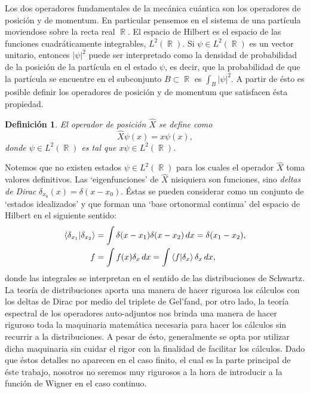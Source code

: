 \documentclass[a4paper]{report}
\DeclareMathOperator{\R}{\mathbb{R}}
\newtheorem{definition}{Definición}
\begin{document}
  Los dos operadores fundamentales de la mecánica cuántica
  son los operadores de posición y de momentum. En
  particular pensemos en el sistema de una partícula
  moviendose sobre la recta real $\R$. El espacio de Hilbert
  es el espacio de las funciones cuadráticamente
  integrables, $L^2(\R)$. Si $\psi \in L^2(\R)$ es un vector
  unitario, entonces $|\psi|^2$ puede ser interpretado como
  la densidad de probabilidad de la posición de la partícula
  en el estado $\psi$, es decir, que la probabilidad de que
  la partícula se encuentre en el subconjunto $B \subset \R$
  es $\int_B |\psi|^2$. A partir de ésto es posible definir
  los operadores de posición y de momentum que satisfacen
  ésta propiedad.

  \begin{definition}
    El operador de posición $\hat X$ se define como
    \[
      \hat X\psi(x) = x\psi(x),
    \] 
    donde $\psi \in L^2(\R)$ es tal que $x\psi \in L^2(\R)$.
  \end{definition}

  Notemos que no existen estados $\psi \in L^2(\R)$ para los
  cuales el operador $\hat X$ toma valores definitivos. Las
  `eigenfunciones' de $\hat X$ nisiquiera son funciones,
  sino \textit{deltas de Dirac} $\delta_{x_0}(x) = \delta(x
  - x_0)$. Éstas se pueden considerar como un conjunto de
  `estados idealizados' y que forman una `base ortonormal
  continua' del espacio de Hilbert en el siguiente sentido:
  \begin{align*}
    \braket{\delta_{x_1}|\delta_{x_2}}
    &= \int \delta(x-x_1)\delta(x-x_2) \, dx
    = \delta(x_1-x_2), \\
    f
    &= \int f(x)\delta_x \, dx
    = \int \braket{f| \delta_x}\delta_x \, dx,
  \end{align*} 
  donde las integrales se interpretan en el sentido de las
  distribuciones de Schwartz. La teoría de distribuciones
  aporta una manera de hacer rigurosa los cálculos con los
  deltas de Dirac por medio del triplete de Gel'fand, por
  otro lado, la teoría espectral de los operadores
  auto-adjuntos nos brinda una manera de hacer riguroso toda
  la maquinaria matemática necesaria para hacer los cálculos
  sin recurrir a la distribuciones. A pesar de ésto,
  generalmente se opta por utilizar dicha maquinaria sin
  cuidar el rigor con la finalidad de facilitar los
  cálculos. Dado que éstos detalles no aparecen en el caso
  finito, el cual es la parte principal de éste trabajo,
  nosotros no seremos muy rigurosos a la hora de introducir
  a la función de Wigner en el caso continuo.
\end{document}
